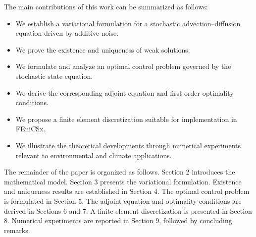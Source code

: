 
The main contributions of this work can be summarized as follows:

\begin{itemize}
\item We establish a variational formulation for a stochastic advection--diffusion equation driven 
by additive noise.
\item We prove the existence and uniqueness of weak solutions.
\item We formulate and analyze an optimal control problem governed by the stochastic state equation.
\item We derive the corresponding adjoint equation and first-order optimality conditions.
\item We propose a finite element discretization suitable for implementation in FEniCSx.
\item We illustrate the theoretical developments through numerical experiments relevant to environmental 
and climate applications.
\end{itemize}


The remainder of the paper is organized as follows. Section 2 introduces the mathematical model. 
Section 3 presents the variational formulation. Existence and uniqueness results are established 
in Section 4. The optimal control problem is formulated in Section 5. The adjoint equation and 
optimality conditions are derived in Sections 6 and 7. A finite element discretization is presented 
in Section 8. Numerical experiments are reported in Section 9, followed by concluding remarks.